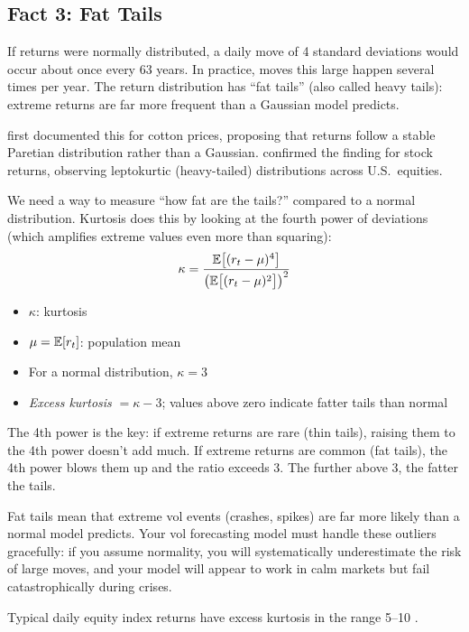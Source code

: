 \subsection{Fact 3: Fat Tails}
\label{sec:fact-fat-tails}

If returns were normally distributed, a daily move of 4 standard deviations would occur about once every 63 years.
In practice, moves this large happen several times per year.
The return distribution has ``fat tails'' (also called heavy tails): extreme returns are far more frequent than a Gaussian model predicts.

\citet{Mandelbrot1963} first documented this for cotton prices, proposing that returns follow a stable Paretian distribution rather than a Gaussian.
\citet{Fama1965} confirmed the finding for stock returns, observing leptokurtic (heavy-tailed) distributions across U.S.\ equities.

\begin{definition}[Kurtosis]
We need a way to measure ``how fat are the tails?'' compared to a normal distribution.
Kurtosis does this by looking at the fourth power of deviations (which amplifies extreme values even more than squaring):
\begin{equation}
  \kappa = \frac{\mathbb{E}\bigl[(r_t - \mu)^4\bigr]}{\bigl(\mathbb{E}\bigl[(r_t - \mu)^2\bigr]\bigr)^2}
  \label{eq:kurtosis}
\end{equation}
\begin{itemize}[nosep]
  \item $\kappa$: kurtosis
  \item $\mu = \mathbb{E}[r_t]$: population mean
  \item For a normal distribution, $\kappa = 3$
  \item \emph{Excess kurtosis} $= \kappa - 3$; values above zero indicate fatter tails than normal
\end{itemize}

\begin{intuition}
The 4th power is the key: if extreme returns are rare (thin tails), raising them to the 4th power doesn't add much.
If extreme returns are common (fat tails), the 4th power blows them up and the ratio exceeds 3.
The further above 3, the fatter the tails.
\end{intuition}

\begin{projectconnection}
Fat tails mean that extreme vol events (crashes, spikes) are far more likely than a normal model predicts.
Your vol forecasting model must handle these outliers gracefully: if you assume normality, you will systematically underestimate the risk of large moves, and your model will appear to work in calm markets but fail catastrophically during crises.
\end{projectconnection}

Typical daily equity index returns have excess kurtosis in the range 5--10 \citep{Cont2001}.
\end{definition}

